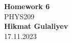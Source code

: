 \begin{titlepage}
    \begin{center}
    {\fontsize{40}{48}\selectfont \bfseries Homework 6} 
    \\\vspace{20pt}
    {\LARGE PHYS209} \\
    \vspace{20pt}
    \textbf{Hikmat Gulaliyev}
    \vspace{8pt}
    \\ 17.11.2023
    \end{center}
\end{titlepage}